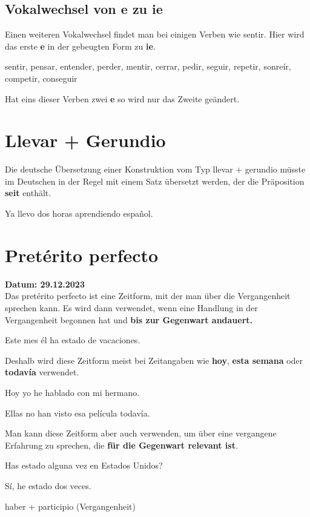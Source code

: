 \subsection*{Vokalwechsel von e zu ie}
Einen weiteren Vokalwechsel findet man bei einigen Verben wie sentir. Hier
wird das erste \textbf{e} in der gebeugten Form zu \textbf{ie}.
\begin{ejemplos}
    \item sentir, pensar, entender, perder, mentir, cerrar, pedir, seguir, 
    repetir, sonre\'ir, competir, conseguir
\end{ejemplos}
Hat eins dieser Verben zwei \textbf{e} so wird nur das Zweite geändert.
\section{Llevar + Gerundio}
Die deutsche Übersetzung einer Konstruktion vom Typ llevar + gerundio
müsste im Deutschen in der Regel mit einem Satz übersetzt werden,
der die Präposition \textbf{seit} enthält.
\begin{ejemplos}
    \item Ya llevo dos horas aprendiendo español.
\end{ejemplos}
\section{Pret\'erito perfecto}
\textbf{Datum: 29.12.2023}\\
Das pret\'erito perfecto ist eine Zeitform, mit der man über
die Vergangenheit sprechen kann. Es wird dann verwendet, wenn eine
Handlung in der Vergangenheit begonnen hat und \textbf{bis zur Gegenwart 
andauert.}
\begin{ejemplos}
    \item Este mes \'el ha estado de vacaciones.
\end{ejemplos}
Deshalb wird diese Zeitform meist bei Zeitangaben wie \textbf{hoy},
\textbf{esta semana} oder \textbf{todav\'ia} verwendet.
\begin{ejemplos}
    \item Hoy yo he hablado con mi hermano.
    \item Ellas no han visto esa pel\'icula todav\'ia.
\end{ejemplos}
Man kann diese Zeitform aber auch verwenden, um über eine 
vergangene Erfahrung zu sprechen, die \textbf{für die Gegenwart
relevant ist}.
\begin{ejemplos}
    \item Has estado alguna vez en Estados Unidos?
    \item S\'i, he estado dos veces.
\end{ejemplos}
\begin{gramatica}
    \item haber + participio (Vergangenheit)
\end{gramatica}
